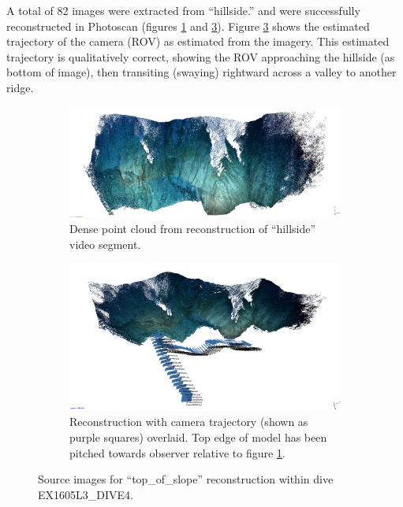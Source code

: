 \documentclass[letterpaper,12pt]{article}
\begin{document}
A total of 82 images were extracted from ``hillside.'' and were successfully reconstructed in Photoscan (figures \ref{fig:ex1605l3_dive4_photoscan} and \ref{fig:ex1605l3_dive4_photoscan_trajectory}).  Figure \ref{fig:ex1605l3_dive4_photoscan_trajectory} shows the estimated trajectory of the camera (ROV) as estimated from the imagery.  This estimated trajectory is qualitatively correct, showing the ROV approaching the hillside (as bottom of image), then transiting (swaying) rightward across a valley to another ridge.   

\begin{figure}
    \centering
    \begin{subfigure}[b]{0.9\textwidth}
        \includegraphics[width=\textwidth]{images/hillside_reconstruction.png}
        \caption{Dense point cloud from reconstruction of ``hillside'' video segment.}
        \label{fig:ex1605l3_dive4_photoscan}
    \end{subfigure}
    \begin{subfigure}[b]{0.9\textwidth}
        \includegraphics[width=\textwidth]{images/hillside_reconstruction_trajectory.png}
        \caption{Reconstruction with camera trajectory (shown as purple squares) overlaid.  Top edge of model has been pitched towards observer relative to figure \ref{fig:ex1605l3_dive4_photoscan}. }
        \label{fig:ex1605l3_dive4_photoscan_trajectory}
    \end{subfigure}
    \caption{Source images for ``top\_of\_slope'' reconstruction within dive EX1605L3\_DIVE4.}
\end{figure}
\end{document}
